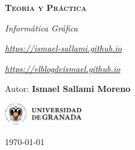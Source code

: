 \documentclass[12pt]{report} %
\begin{document}
\begin{titlepage}
    \begin{center}
        \vspace*{2cm}
        
        {\Huge \bfseries\scshape Teoría y Práctica \par}
        \vspace{0.5cm}
        {\Large \itshape Informática Gráfica \par}
        \vspace{0.5cm}
        {\small \itshape \href{https://ismael-sallami.github.io}{https://ismael-sallami.github.io} \par}
        {\small \itshape \href{https://elblogdeismael.github.io}{https://elblogdeismael.github.io} \par}


        \vfill
        
        {\LARGE Autor: \textbf{Ismael Sallami Moreno} \par}
        \vspace{0.3cm}
        
        \vspace{1cm}
        \includegraphics[width=0.25\textwidth]{../../../extraFiles/img/ugr.png} %
        \vspace{1cm}
        
        {\large \today}
    \end{center}
    
    \restoregeometry
\end{titlepage}


\thispagestyle{empty} %
\clearpage

\tableofcontents
\listoffigures
\clearpage

\listoftables
\clearpage
\thispagestyle{empty} %
\clearpage

\renewcommand{\lstlistlistingname}{Índice de Código}
\lstlistoflistings
\clearpage

\renewcommand{\listtheoremname}{Índice de Ecuaciones}
\listoftheorems[ignoreall,show={equation}]
\clearpage
\end{document}
